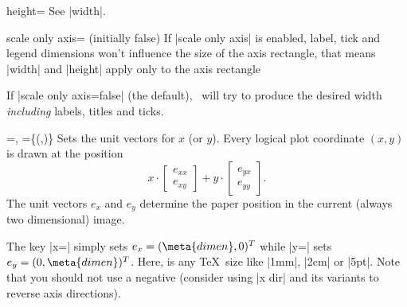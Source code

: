 \begin{pgfplotskey}{height=}
	See |width|.
\end{pgfplotskey}

\begin{pgfplotskey}{scale only axis= (initially false)}
If |scale only axis| is enabled, label, tick and legend dimensions won't influence the size of the axis rectangle, that means |width| and |height| apply only to the axis rectangle

If |scale only axis=false| (the default), \PGFPlots\ will try to produce the desired width \emph{including} labels, titles and ticks.
\end{pgfplotskey}

\begin{pgfplotsxykeylist}{
	\x=,
	\x={\{(,)\}}}
Sets the unit vectors for $x$ (or $y$). Every logical plot coordinate $(x,y)$ is drawn at the position
\[ x \cdot \begin{bmatrix} e_{xx} \\ e_{xy} \end{bmatrix} + y \cdot \begin{bmatrix} e_{yx} \\ e_{yy} \end{bmatrix}. \]
The unit vectors $e_x$ and $e_y$ determine the paper position in the current (always two dimensional) image.

The key |x=| simply sets $e_x = (\meta{dimen},0)^T $ while |y=| sets $e_y = (0,\meta{dimen})^T$.
Here,  is any \TeX\ size like |1mm|, |2cm| or |5pt|. Note that you should not use a negative  (consider using |x dir| and its variants to reverse axis directions).
\begin{codeexample}[]
\end{codeexample}

\begin{codeexample}[]
\end{codeexample}


\end{pgfplotsxykeylist}
